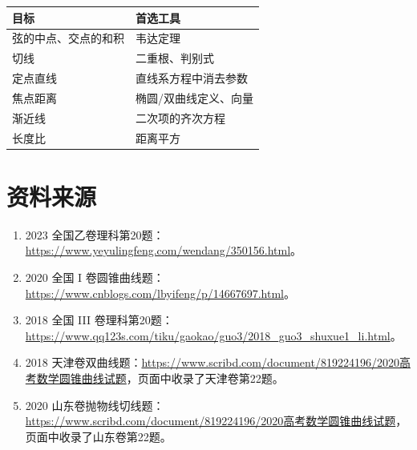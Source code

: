 \documentclass[11pt,a4paper]{ctexart}
\begin{document}
\begin{center}
\begin{tabular}{ll}
\toprule
目标 & 首选工具\\
\midrule
弦的中点、交点的和积 & 韦达定理\\
切线 & 二重根、判别式\\
定点直线 & 直线系方程中消去参数\\
焦点距离 & 椭圆/双曲线定义、向量\\
渐近线 & 二次项的齐次方程\\
长度比 & 距离平方\\
\bottomrule
\end{tabular}
\end{center}

\section*{资料来源}
\begin{enumerate}
\item 2023 全国乙卷理科第20题：\url{https://www.yeyulingfeng.com/wendang/350156.html}。
\item 2020 全国 I 卷圆锥曲线题：\url{https://www.cnblogs.com/lbyifeng/p/14667697.html}。
\item 2018 全国 III 卷理科第20题：\url{https://www.qq123s.com/tiku/gaokao/guo3/2018_guo3_shuxue1_li.html}。
\item 2018 天津卷双曲线题：\url{https://www.scribd.com/document/819224196/2020高考数学圆锥曲线试题}，页面中收录了天津卷第22题。
\item 2020 山东卷抛物线切线题：\url{https://www.scribd.com/document/819224196/2020高考数学圆锥曲线试题}，页面中收录了山东卷第22题。
\end{enumerate}
\end{document}
